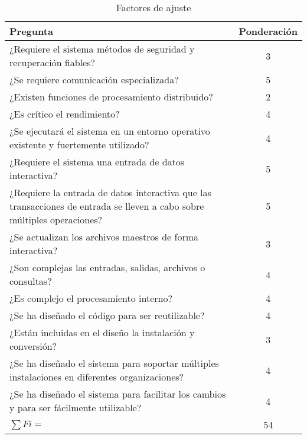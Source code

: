 	\begin{table}[H]
		\centering
		\begin{tabular}{|p{9cm}|c|}
		\hline
		Pregunta                                                                                                                 & Ponderación \\ \hline
		¿Requiere el sistema métodos de seguridad y recuperación fiables?                                                        & 3           \\ \hline
		¿Se requiere comunicación especializada?                                                                             		 & 5           \\ \hline
		¿Existen funciones de procesamiento distribuido?                                                                         & 2           \\ \hline
		¿Es crítico el rendimiento?                                                                                              & 4           \\ \hline
		¿Se ejecutará el sistema en un entorno operativo existente y fuertemente utilizado?                                      & 4           \\ \hline
		¿Requiere el sistema una entrada de datos interactiva?                                                                   & 5           \\ \hline
		¿Requiere la entrada de datos interactiva que las transacciones de entrada se lleven a cabo sobre múltiples operaciones? & 5           \\ \hline
		¿Se actualizan los archivos maestros de forma interactiva?                                                               & 3           \\ \hline
		¿Son complejas las entradas, salidas, archivos o consultas?                                                              & 4           \\ \hline
		¿Es complejo el procesamiento interno?                                                                                   & 4           \\ \hline
		¿Se ha diseñado el código para ser reutilizable?                                                                         & 4           \\ \hline
		¿Están incluidas en el diseño la instalación y conversión?                                                               & 3           \\ \hline
		¿Se ha diseñado el sistema para soportar múltiples instalaciones en diferentes organizaciones?                           & 4           \\ \hline
		¿Se ha diseñado el sistema para facilitar los cambios y para ser fácilmente utilizable?                                  & 4           \\ \hline
		\centering $\sum Fi=$                                                                                                  	 & 54          \\ \hline
		\end{tabular}
		\caption{Factores de ajuste}
		\label{tab:questions_adjusment}
		\end{table}


